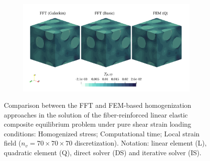 \begin{figure}[hbt]
\begin{subfigure}[b]{0.49\textwidth}
    \caption{}
    \label{subfig:linear_3D_shear_cpu_time_vs_n_voxels}
  \end{subfigure}
  \begin{subfigure}[b]{\textwidth}
    \centering
    \includegraphics[width=\textwidth]{figures/linear_3D_shear_strain_12}
    \caption{}
    \label{subfig:linear_3D_shear_strain_12}
  \end{subfigure}
  \caption{Comparison between the FFT and FEM-based homogenization approaches in the
  solution of the fiber-reinforced linear elastic composite equilibrium problem under pure shear
  strain loading conditions:  Homogenized stress;  Computational time;  Local strain field
  (\(n_v = 70 \times 70 \times 70\) discretization). Notation: linear element (L), quadratic element (Q), direct solver
  (DS) and iterative solver (IS).}
\label{fig:linear_3D_shear}
\end{figure}

